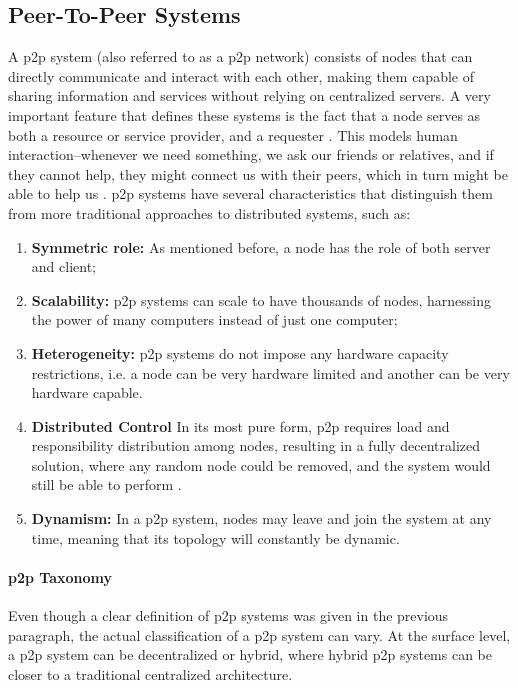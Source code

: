 \subsection{Peer-To-Peer Systems}
\label{ssec:p2p_systems}

A \gls{p2p} system (also referred to as a \gls{p2p} network) consists of nodes that can directly communicate and interact with each other, making them capable of sharing information and services without relying on centralized servers. A very important feature that defines these systems is the fact that a node serves as both a resource or service provider, and a requester \cite{Schollmeier2002}. This models human interaction--whenever we need something, we ask our friends or relatives, and if they cannot help, they might connect us with their peers, which in turn might be able to help us \cite{Vu2010}. \gls{p2p} systems have several characteristics that distinguish them from more traditional approaches to distributed systems, such as:
\begin{enumerate}
\item \textbf{Symmetric role:} As mentioned before, a node has the role of both server and client;
\item \textbf{Scalability:} \Gls{p2p} systems can scale to have thousands of nodes, harnessing the power of many computers instead of just one computer;
\item \textbf{Heterogeneity:} \Gls{p2p} systems do not impose any hardware capacity restrictions, i.e. a node can be very hardware limited and another can be very hardware capable.
\item \textbf{Distributed Control} In its most pure form, \gls{p2p} requires load and responsibility distribution among nodes, resulting in a fully decentralized solution, where any random node could be removed, and the system would still be able to perform \cite{Schollmeier2002}.
\item \textbf{Dynamism:} In a \gls{p2p} system, nodes may leave and join the system at any time, meaning that its topology will constantly be dynamic.
\end{enumerate}

\paragraph{\Gls{p2p} Taxonomy} Even though a clear definition of \gls{p2p} systems was given in the previous paragraph, the actual classification of a \gls{p2p} system can vary. At the surface level, a \gls{p2p} system can be decentralized or hybrid, where hybrid \gls{p2p} systems can be closer to a traditional centralized architecture.

